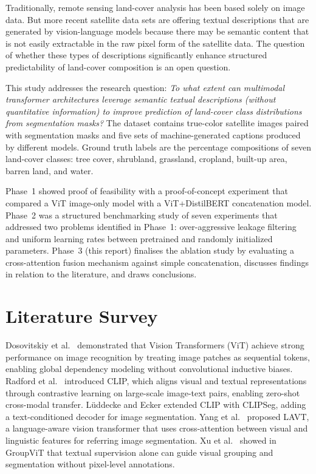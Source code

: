 \documentclass[conference]{IEEEtran}
\begin{document}
Traditionally, remote sensing land-cover analysis has been based solely on image data.
But more recent satellite data sets are offering textual descriptions that are generated
by vision-language models because there may be semantic content that is not easily
extractable in the raw pixel form of the satellite data. The question of whether these
types of descriptions significantly enhance structured predictability of land-cover
composition is an open question.

This study addresses the research question: \textit{To what extent can multimodal
transformer architectures leverage semantic textual descriptions (without quantitative
information) to improve prediction of land-cover class distributions from segmentation
masks?} The dataset contains true-color satellite images paired with segmentation masks
and five sets of machine-generated captions produced by different models. Ground truth
labels are the percentage compositions of seven land-cover classes: tree cover,
shrubland, grassland, cropland, built-up area, barren land, and water.

Phase~1 showed proof of feasibility with a proof-of-concept experiment that compared a
ViT image-only model with a ViT+DistilBERT concatenation model. Phase~2 was a
structured benchmarking study of seven experiments that addressed two problems
identified in Phase~1: over-aggressive leakage filtering and uniform learning rates
between pretrained and randomly initialized parameters. Phase~3 (this report) finalises
the ablation study by evaluating a cross-attention fusion mechanism against simple
concatenation, discusses findings in relation to the literature, and draws conclusions.

\section{Literature Survey}

Dosovitskiy et al.\ \cite{dosovitskiy2021} demonstrated that Vision Transformers (ViT)
achieve strong performance on image recognition by treating image patches as sequential
tokens, enabling global dependency modeling without convolutional inductive biases.
Radford et al.\ \cite{radford2021} introduced CLIP, which aligns visual and textual
representations through contrastive learning on large-scale image-text pairs, enabling
zero-shot cross-modal transfer. L\"{u}ddecke and Ecker \cite{luddecke2022} extended
CLIP with CLIPSeg, adding a text-conditioned decoder for image segmentation. Yang
et al.\ \cite{yang2022lavt} proposed LAVT, a language-aware vision transformer that
uses cross-attention between visual and linguistic features for referring image
segmentation. Xu et al.\ \cite{xu2022groupvit} showed in GroupViT that textual
supervision alone can guide visual grouping and segmentation without pixel-level
annotations.
\end{document}
